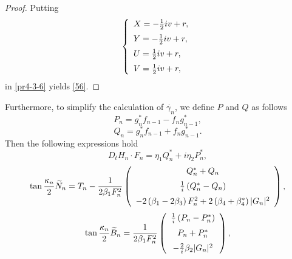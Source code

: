 \documentclass[10pt,leqno]{amsart}
\numberwithin{equation}{section}
\begin{document}
\begin{proof}
Putting
\begin{eqnarray}\label{prbil56-1}
\left\{
\begin{array}{l}
\vspace{2mm}
X=-\frac{1}{2}iv+r,\\
\vspace{2mm}
Y=-\frac{1}{2}iv+r,\\
\vspace{2mm}
U=\frac{1}{2}iv+r,\\
V=\frac{1}{2}iv+r,\\
\end{array}
\right.
\end{eqnarray}
in \eqref{pr4-3-6} yields \eqref{56}. 
\end{proof}

Furthermore, to simplify the calculation of $\dot{\gamma_n}$, we define $P$ and $Q$ as follows
\begin{equation}\label{64}
P_{n}=g_{n}^{*}f_{n-1}-f_{n}g_{n-1}^{*},
\end{equation}
\begin{equation}\label{65}
Q_{n}=g_{n}^{*}f_{n-1}+f_{n}g_{n-1}^{*}.
\end{equation}
Then the following expressions hold
\begin{equation}\label{69}
D_{t}H_{n}\cdot F_{n}=\eta_{1}Q_{n}^{*}+i\eta_{2}P_{n}^{*},
\end{equation}
\begin{equation}\label{N2}
  \tan\frac{\kappa_{n}}{2} \widetilde{N}_{n}=T_{n}-\frac{1}{2\beta_{1} F_{n}^{2}} \left(
    \begin{array}{c}
    \vspace{2mm}
        Q_{n}^{*}+Q_{n}\\
        \vspace{2mm}
       \frac{1}{i}\left(Q_{n}^{*}-Q_{n}\right)\\
       -2\left(\beta_{1}-2\beta_{3}\right)F_{n}^{2}+2\left(\beta_{4}+\beta_{4}^{*}\right) |G_{n}|^{2} 
    \end{array}
  \right),
\end{equation}
\begin{equation}\label{B2}
  \tan\frac{\kappa_{n}}{2}\widetilde{B}_{n}= \frac{1}{2\beta_{1} F_{n}^{2}} \left(
    \begin{array}{c}
    \vspace{2mm}
       \frac{1}{i}\left(P_{n}-P_{n}^{*}\right) \\
       \vspace{2mm}
       P_{n}+P_{n}^{*}\\
       -\frac{2}{i}\beta_{2} |G_{n}|^{2} 
    \end{array}
  \right),
\end{equation}
\end{document}
